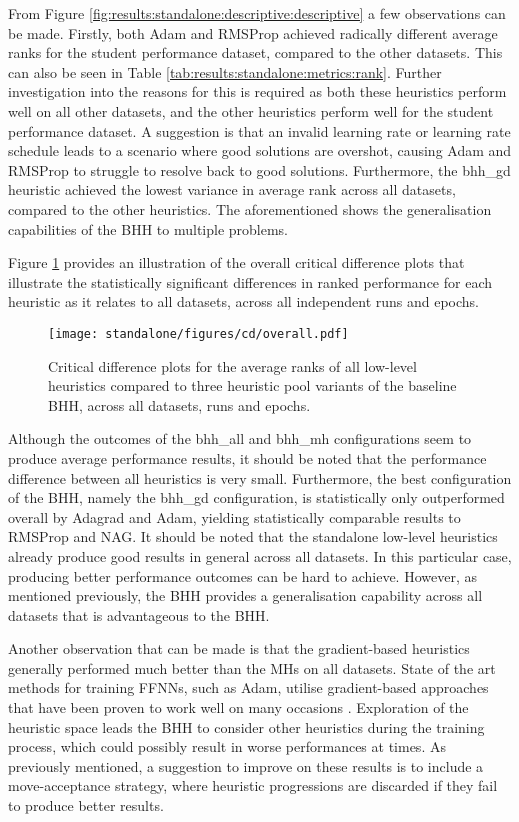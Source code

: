 From Figure \ref{fig:results:standalone:descriptive:descriptive} a few observations can be made. Firstly, both \acs{Adam} and \acs{RMSProp} achieved radically different average ranks for the student performance dataset, compared to the other datasets. This can also be seen in Table \ref{tab:results:standalone:metrics:rank}. Further investigation into the reasons for this is required as both these heuristics perform well on all other datasets, and the other heuristics perform well for the student performance dataset. A suggestion is that an invalid learning rate or learning rate schedule leads to a scenario where good solutions are overshot, causing \acs{Adam} and \acs{RMSProp} to struggle to resolve back to good solutions. Furthermore, the bhh\_gd heuristic achieved the lowest variance in average rank across all datasets, compared to the other heuristics. The aforementioned shows the generalisation capabilities of the \acs{BHH} to multiple problems.

Figure \ref{fig:results:standalone:descriptive:cd} provides an illustration of the overall critical difference plots that illustrate the statistically significant differences in ranked performance for each heuristic as it relates to all datasets, across all independent runs and epochs.

\begin{figure}[htb]
	\centering
	\texttt{[image: standalone/figures/cd/overall.pdf]}
	\caption{Critical difference plots for the average ranks of all low-level heuristics compared to three heuristic pool variants of the baseline \acs{BHH}, across all datasets, runs and epochs.}
	\label{fig:results:standalone:descriptive:cd}
\end{figure}

Although the outcomes of the bhh\_all and bhh\_mh configurations seem to produce average performance results, it should be noted that the performance difference between all heuristics is very small. Furthermore, the best configuration of the \acs{BHH}, namely the bhh\_gd configuration, is statistically only outperformed overall by \acs{Adagrad} and \acs{Adam}, yielding statistically comparable results to \acs{RMSProp} and \acs{NAG}. It should be noted that the standalone low-level heuristics already produce good results in general across all datasets. In this particular case, producing better performance outcomes can be hard to achieve. However, as mentioned previously, the \acs{BHH} provides a generalisation capability across all datasets that is advantageous to the \acs{BHH}.

Another observation that can be made is that the gradient-based heuristics generally performed much better than the \acp{MH} on all datasets. State of the art methods for training \acp{FFNN}, such as \acs{Adam}, utilise gradient-based approaches that have been proven to work well on many occasions \cite{ref:kingma:2014}. Exploration of the heuristic space leads the \acs{BHH} to consider other heuristics during the training process, which could possibly result in worse performances at times. As previously mentioned, a suggestion to improve on these results is to include a move-acceptance strategy, where heuristic progressions are discarded if they fail to produce better results.